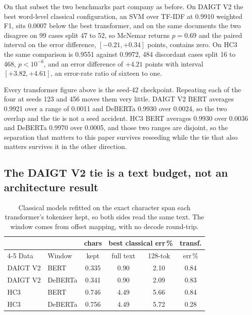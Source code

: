 \documentclass[conference,a4paper]{IEEEtran}
\begin{document}
On that subset the two benchmarks part company as before. On DAIGT V2 the best word-level classical configuration, an SVM over TF-IDF at 0.9910 weighted F1, sits 0.0007 below the best transformer, and on the same documents the two disagree on 99 cases split 47 to 52, so McNemar returns $p=0.69$ and the paired interval on the error difference, $[-0.21, +0.34]$ points, contains zero. On HC3 the same comparison is 0.9551 against 0.9972, 484 discordant cases split 16 to 468, $p < 10^{-6}$, and an error difference of $+4.21$ points with interval $[+3.82, +4.61]$, an error-rate ratio of sixteen to one.

Every transformer figure above is the seed-42 checkpoint. Repeating each of the four at seeds 123 and 456 moves them very little. DAIGT V2 BERT averages 0.9921 over a range of 0.0011 and DeBERTa 0.9930 over 0.0024, so the two overlap and the tie is not a seed accident. HC3 BERT averages 0.9930 over 0.0036 and DeBERTa 0.9970 over 0.0005, and those two ranges are disjoint, so the separation that matters to this paper survives reseeding while the tie that also matters survives it in the other direction.

\subsection{The DAIGT V2 tie is a text budget, not an architecture result}
\label{sec:budget}

\begin{table}[!ht]
\centering
\caption{Classical models refitted on the exact character span each transformer's tokeniser kept, so both sides read the same text. The window comes from offset mapping, with no decode round-trip.}
\label{tab:budget}
\footnotesize
\setlength{\tabcolsep}{3.5pt}
\begin{tabular}{@{}llcccc@{}}
\toprule
& & chars & \multicolumn{2}{c}{best classical err\,\%} & transf. \\
\cmidrule(lr){4-5}
Data & Window & kept & full text & 128-tok & err\,\% \\
\midrule
DAIGT V2 & BERT & 0.335 & 0.90 & 2.10 & 0.84 \\
DAIGT V2 & DeBERTa & 0.341 & 0.90 & 2.09 & 0.83 \\
HC3 & BERT & 0.746 & 4.49 & 5.66 & 0.84 \\
HC3 & DeBERTa & 0.756 & 4.49 & 5.72 & 0.28 \\
\bottomrule
\end{tabular}
\end{table}
\end{document}
